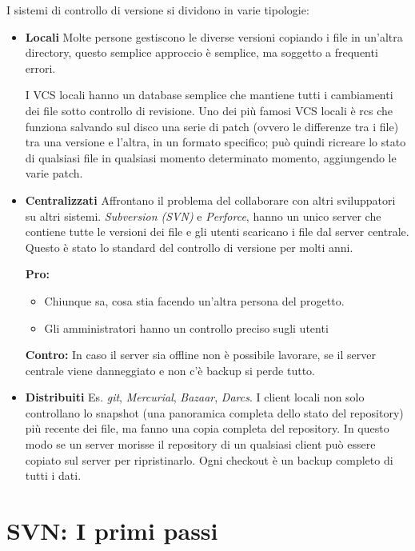 I sistemi di controllo di versione si dividono in varie tipologie: 
\begin{itemize}
\item \textbf{Locali} Molte persone gestiscono le diverse versioni copiando i file in un'altra directory, questo semplice approccio è semplice, ma soggetto a frequenti errori. 

I VCS locali hanno un database semplice che mantiene tutti i cambiamenti dei file sotto controllo di revisione. Uno dei più famosi VCS locali è rcs che  funziona salvando sul disco una serie di patch (ovvero le differenze tra i file) tra una versione e l'altra, in un formato specifico; può quindi ricreare lo stato di qualsiasi file in qualsiasi momento determinato momento, aggiungendo le varie patch.

\item \textbf{Centralizzati} Affrontano il problema del collaborare con altri sviluppatori su altri sistemi. \textit{Subversion (SVN)} e \textit{Perforce}, hanno un unico server che contiene tutte le versioni dei file e gli utenti scaricano i file dal server centrale. Questo è stato lo standard del controllo di versione per molti anni.

\textbf{Pro:} 
\begin{itemize}
\item Chiunque sa, cosa stia facendo un'altra persona del progetto. \item Gli amministratori hanno un controllo preciso sugli utenti
\end{itemize}

\textbf{Contro:} 
In caso il server sia offline non è possibile lavorare, se il server centrale viene danneggiato e non c'è backup si perde tutto.

\item \textbf{Distribuiti} Es. \textit{git}, \textit{Mercurial}, \textit{Bazaar}, \textit{Darcs}. I client locali non solo controllano lo snapshot (una panoramica completa dello stato del repository) più recente dei file, ma fanno una copia completa del repository. In questo modo se un server morisse il repository di un qualsiasi client può essere copiato sul server per ripristinarlo. Ogni checkout è un backup completo di tutti i dati.
\end{itemize}

\section{SVN: I primi passi}
